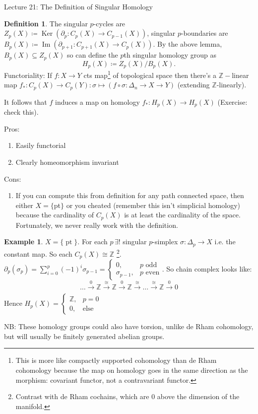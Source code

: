 \documentclass[10pt]{article}
\theoremstyle{plain}
\theoremstyle{definition}
\newtheorem{defn}[thm]{Definition} %
\newtheorem{exmp}[thm]{Example} %
\newcommand{\sumfromto}[2]{\sum\limits_{#1}^{#2}}
\DeclareMathOperator{\Ker}{Ker}
\DeclareMathOperator{\Ima}{Im}
\newcommand{\mycasesthing}[2]{\begin{cases} #1 \\ #2\end{cases}}
\DeclareMathOperator{\pt}{pt}
\newcommand{\homX}[1]{H_{#1}(X)}
\newcommand{\ZX}[1]{Z_{#1}(X)}
\newcommand{\BX}[1]{B_{#1}(X)}
\begin{document}
\begin{section}{Lecture 21: The Definition of Singular Homology}
\begin{defn}
The singular $p$-cycles are $\ZX{p} \coloneqq \Ker(\partial_p:C_p(X)\to C_{p-1}(X))$, singular $p$-boundaries are $\BX{p} \coloneqq \Ima (\partial_{p+1} : C_{p+1}(X) \to C_p(X))$. By the above lemma, $\BX{p} \subseteq \ZX{p}$ so can define the $p$th singular homology group as $$\homX{p} \coloneqq \ZX{p} / \BX{p}.$$
\noindent
Functoriality: If $f:X\to Y$ cts map\footnote{This is more like compactly supported cohomology than de Rham cohomology because the map on homology goes in the same direction as the morphism: covariant functor, not a contravariant functor. } of topological space then there's a $\mathbb{Z}-$linear map $f_*:C_p(X) \to C_p(Y) : \sigma \mapsto (f\circ \sigma : \Delta_n \to X \to Y)$ (extending $\mathbb{Z}$-linearly).
\end{defn}

It follows that $f$ induces a map on homology $f_*: H_p(X) \to H_p(X)$ (Exercise: check this).

Pros:
\begin{enumerate}
    \item Easily functorial
    \item Clearly homeomorphism invariant
\end{enumerate}
Cons:
\begin{enumerate}
    \item If you can compute this from definition for any path connected space, then either $X = \{$pt$\}$ or you cheated (remember this isn't simplicial homology) because the cardinality of $C_p(X)$ is at least the cardinality of the space. Fortunately, we never really work with the definition.
\end{enumerate}
\begin{exmp}
    $X = \{\pt\}$. For each $p\, \exists ! $ singular $p$-simplex $\sigma:\Delta_p \to X$ i.e. the constant map. So each $C_p(X) \cong \mathbb{Z}$ \footnote{Contrast with de Rham cochains, which are 0 above the dimension of the manifold.}. $\partial_p(\sigma_p) = \sumfromto{i=0}{p} (-1)^i \sigma_{p-1} = \mycasesthing{0,& p \text{ odd}}{\sigma_{p-1},& p \text{ even}}$. So chain complex looks like:
    $$
    \ldots \xrightarrow[]{0}\mathbb{Z}\xrightarrow[]{\cong} \mathbb{Z}  \xrightarrow[]{0}  \mathbb{Z} \xrightarrow[]{\cong}\ldots \xrightarrow[]{\cong}\mathbb{Z}    \xrightarrow[]{0} 0
    $$
    Hence $H_p(X) =\mycasesthing{ \mathbb{Z},& p= 0}{0,&\text{else}} $
\end{exmp}
NB: These homology groups could also have torsion, unlike de Rham cohomology, but will usually be finitely generated abelian groups.
\end{section}
\end{document}
